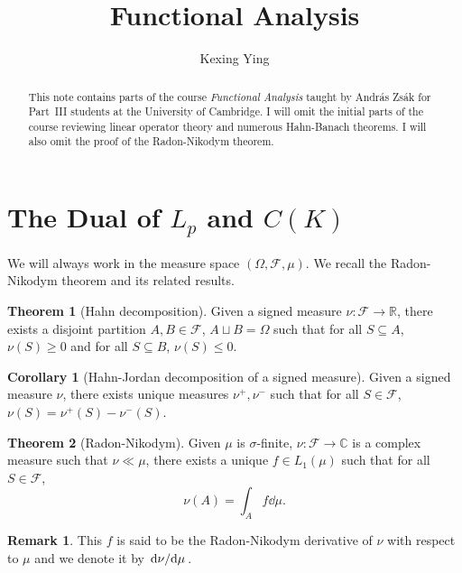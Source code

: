 \documentclass[]{article}
\title{Functional Analysis}
\author{Kexing Ying}
\theoremstyle{definition}
\newtheorem{theorem}{Theorem}
\newtheorem{corollary}{Corollary}[theorem]
\newtheorem*{remark}{Remark}
\begin{document}
\maketitle
\begin{abstract}
  \noindent This note contains parts of the course \textit{Functional Analysis} taught by András Zsák for 
  Part~III students at the University of Cambridge. I will omit the initial parts of the course 
  reviewing linear operator theory and numerous Hahn-Banach theorems. I will also omit the proof of the 
  Radon-Nikodym theorem. 
\end{abstract}

\tableofcontents

\newpage
\section{The Dual of \texorpdfstring{\(L_p\)}{Lp} and \texorpdfstring{\(C(K)\)}{C(K)}}

We will always work in the measure space \((\Omega, \mathcal{F}, \mu)\). We recall the Radon-Nikodym 
theorem and its related results.

\begin{theorem}[Hahn decomposition]
  Given a signed measure \(\nu : \mathcal{F} \to \mathbb{R}\), there exists a disjoint partition 
  \(A, B \in \mathcal{F}\), \(A \sqcup B = \Omega\) such that for all \(S \subseteq A\), 
  \(\nu(S) \geq 0\) and for all \(S \subseteq B\), \(\nu(S) \leq 0\).
\end{theorem}

\begin{corollary}[Hahn-Jordan decomposition of a signed measure]
  Given a signed measure \(\nu\), there exists unique measures \(\nu^+, \nu^-\) such that for all 
  \(S \in \mathcal{F}\), \(\nu(S) = \nu^+(S) - \nu^-(S)\).
\end{corollary}

\begin{theorem}[Radon-Nikodym]
  Given \(\mu\) is \(\sigma\)-finite, \(\nu : \mathcal{F} \to \mathbb{C}\) is a complex measure 
  such that \(\nu \ll \mu\), there exists a unique \(f \in L_1(\mu)\) such that for all 
  \(S \in \mathcal{F}\), 
  \[\nu(A) = \int_A f \dd \mu.\]
\end{theorem}

\begin{remark}
  This \(f\) is said to be the Radon-Nikodym derivative of \(\nu\) with respect to \(\mu\) and we 
  denote it by \(\dv*{\nu}{\mu}\).
\end{remark}
\end{document}
